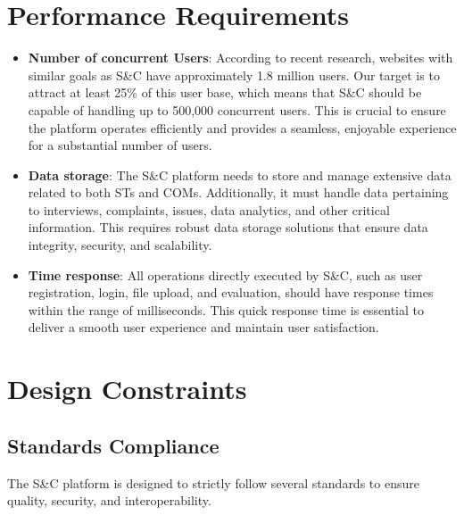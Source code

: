 \section{Performance Requirements}
\begin{itemize}
    \item \textbf{Number of concurrent Users}: According to recent research, websites with similar goals as S\&C have approximately 1.8 million users. Our target is to attract at least 25\% of this user base, which means that S\&C should be capable of handling up to 500,000 concurrent users. This is crucial to ensure the platform operates efficiently and provides a seamless, enjoyable experience for a substantial number of users.

    \item \textbf{Data storage}: The S\&C platform needs to store and manage extensive data related to both STs and COMs. Additionally, it must handle data pertaining to interviews, complaints, issues, data analytics, and other critical information. This requires robust data storage solutions that ensure data integrity, security, and scalability.

    \item \textbf{Time response}: All operations directly executed by S\&C, such as user registration, login, file upload, and evaluation, should have response times within the range of milliseconds. This quick response time is essential to deliver a smooth user experience and maintain user satisfaction. 
   
\end{itemize}


\section{Design Constraints}
\subsection{Standards Compliance}
The S\&C platform is designed to strictly follow several standards to ensure quality, security, and interoperability. 

